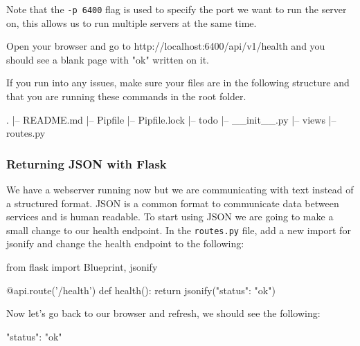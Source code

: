 \documentclass{csse4400}
\begin{document}
Note that the \texttt{-p 6400} flag is used to specify the port we want to run the server on,
this allows us to run multiple servers at the same time.

Open your browser and go to http://localhost:6400/api/v1/health and you should see a blank page with "ok" written on it.

If you run into any issues, make sure your files are in the following structure and that you are running these commands in the root folder.

\noindent\begin{minipage}{\textwidth}
\begin{code}[language=bash,numbers=none]{}
  .
  |-- README.md
  |-- Pipfile
  |-- Pipfile.lock
  |-- todo
      |-- __init__.py
      |-- views
          |-- routes.py
\end{code}
\end{minipage}

\subsubsection{Returning JSON with Flask}

We have a webserver running now but we are communicating with text instead of a structured format. JSON is a common format to communicate data between services and is human readable. To start using JSON we are going to make a small change to our health endpoint. In the \texttt{routes.py} file, add a new import for jsonify and change the health endpoint to the following:

\begin{code}[language=python]{}
from flask import Blueprint, jsonify
\end{code}

\begin{code}[language=python,firstnumber=6]{}
  @api.route('/health')
  def health():
      return jsonify({"status": "ok"})
\end{code}

Now let's go back to our browser and refresh, we should see the following:

\begin{code}[language=json,numbers=none]{}
  {
    "status": "ok"
  }
\end{code}

\end{document}
